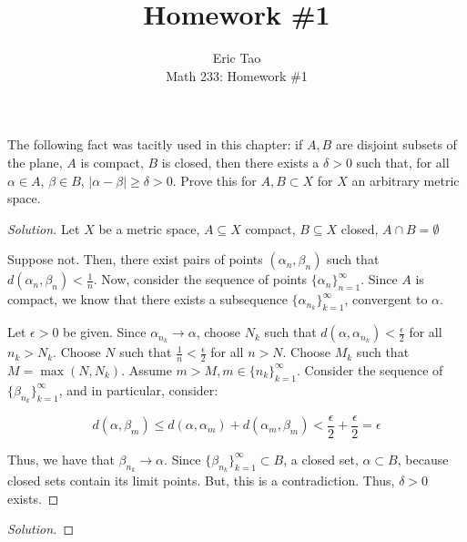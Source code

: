 \documentclass[10pt]{article}
\newenvironment{problem}[2][]{\begin{trivlist}
\item[\hskip \labelsep {\bfseries #1}\hskip \labelsep {\bfseries #2.}]}{\end{trivlist}}
\begin{document}
 
\title{Homework \#1}
\author{Eric Tao\\
Math 233: Homework \#1}
\maketitle

\begin{problem}{Question 1}
The following fact was tacitly used in this chapter: if $A, B$ are disjoint subsets of the plane, $A$ is compact, $B$ is closed, then there exists a $\delta > 0$ such that, for all $\alpha \in A$, $\beta \in B$, $| \alpha - \beta | \geq \delta > 0$. Prove this for $A, B \subset X$ for $X$ an arbitrary metric space. 

\end{problem}
\begin{proof}[Solution]

Let $X$ be a metric space, $A \subseteq X$ compact, $B \subseteq X$ closed, $A \cap B = \emptyset$

Suppose not. Then, there exist pairs of points $(\alpha_n, \beta_n)$ such that $d(\alpha_n,\beta_n) < \frac{1}{n}$. Now, consider the sequence of points $\{ \alpha_n \}_{n=1}^\infty$. Since $A$ is compact, we know that there exists a subsequence $\{ \alpha_{n_k} \}_{k=1}^\infty$, convergent to $\alpha$. 

Let $\epsilon > 0$ be given. Since $\alpha_{n_k} \to \alpha$, choose $N_k$ such that $d(\alpha, \alpha_{n_k}) < \frac{\epsilon}{2}$ for all $n_k > N_k$. Choose $N$ such that $\frac{1}{n} < \frac{\epsilon}{2}$ for all $n > N$. Choose $M_k$ such that $M = \max(N, N_k)$. Assume $m > M, m \in \{ n_k \}_{k=1}^\infty$. Consider the sequence of $\{ \beta_{n_k} \}_{k=1}^\infty$, and in particular, consider:

$$ d(\alpha, \beta_m) \leq d(\alpha, \alpha_m) + d(\alpha_m, \beta_m) < \frac{\epsilon}{2} + \frac{\epsilon}{2} = \epsilon$$

Thus, we have that $\beta_{n_k} \to \alpha$. Since $\{ \beta_{n_k} \}_{k=1}^\infty\subset B$, a closed set, $ \alpha \subset B$, because closed sets contain its limit points. But, this is a contradiction. Thus, $\delta > 0$ exists.
\end{proof}

\begin{problem}{Question 2}

\end{problem}

\begin{proof}[Solution]


\end{proof}
\end{document}
